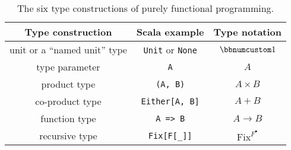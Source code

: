 \begin{wraptable}{l}{0.6\columnwidth}%
\begin{centering}
\vspace{-0.2\baselineskip}
\begin{tabular}{|c|c|c|}
\hline 
\textbf{\small{}Type construction} & \textbf{\small{}Scala example} & \textbf{\small{}Type notation}\tabularnewline
\hline 
\hline 
{\small{}unit or a ``named unit'' type} & {\small{}}\lstinline!Unit!{\small{} or }\lstinline!None!{\small{} } & {\small{}$\bbnum 1$}\tabularnewline
\hline 
{\small{}type parameter} & {\small{}}\lstinline!A! & {\small{}$A$}\tabularnewline
\hline 
{\small{}product type} & {\small{}}\lstinline!(A, B)! & {\small{}$A\times B$}\tabularnewline
\hline 
{\small{}co-product type} & {\small{}}\lstinline!Either[A, B]! & {\small{}$A+B$}\tabularnewline
\hline 
{\small{}function type} & {\small{}}\lstinline!A => B! & {\small{}$A\rightarrow B$}\tabularnewline
\hline 
{\small{}recursive type} & {\small{}}\lstinline!Fix[F[_]]! & {\small{}$\text{Fix}^{F^{\bullet}}$}\tabularnewline
\hline 
\end{tabular}
\par\end{centering}
\caption{The six type constructions of purely functional programming.\label{tab:six-pure-type-constructions}}
\vspace{-0.2\baselineskip}
\end{wraptable}%

